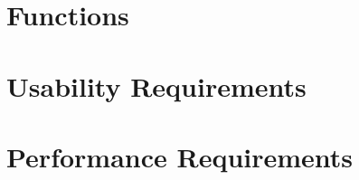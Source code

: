\documentclass{scrreprt}
\begin{document}
\section{Functions}


\section{Usability Requirements}

 
 


\section{Performance Requirements}

\end{document}
